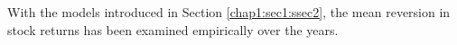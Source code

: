 With the models introduced in Section \ref{chap1:sec1:ssec2}, the mean reversion in stock returns
has been examined empirically over the years.